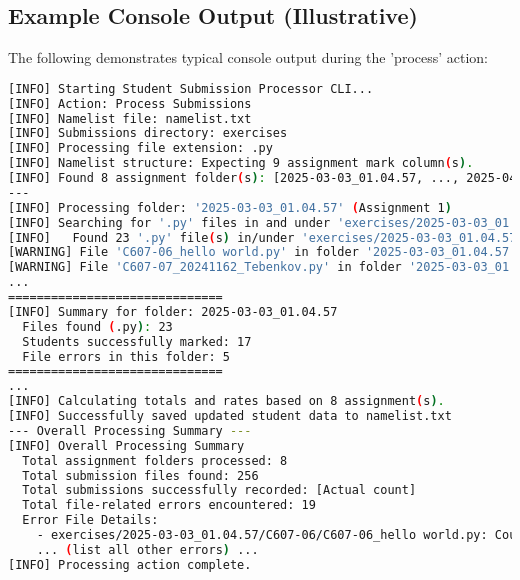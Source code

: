 \documentclass[11pt, a4paper]{article}
\begin{document}
\subsection*{Example Console Output (Illustrative)}
The following demonstrates typical console output during the 'process' action:
\begin{lstlisting}[language=bash, caption=Illustrative Console Output, basicstyle=\ttfamily\tiny]
[INFO] Starting Student Submission Processor CLI...
[INFO] Action: Process Submissions
[INFO] Namelist file: namelist.txt
[INFO] Submissions directory: exercises
[INFO] Processing file extension: .py
[INFO] Namelist structure: Expecting 9 assignment mark column(s).
[INFO] Found 8 assignment folder(s): [2025-03-03_01.04.57, ..., 2025-04-21_01.40.00]
---
[INFO] Processing folder: '2025-03-03_01.04.57' (Assignment 1)
[INFO] Searching for '.py' files in and under 'exercises/2025-03-03_01.04.57'...
[INFO]   Found 23 '.py' file(s) in/under 'exercises/2025-03-03_01.04.57'.
[WARNING] File 'C607-06_hello world.py' in folder '2025-03-03_01.04.57': Could not extract student ID.
[WARNING] File 'C607-07_20241162_Tebenkov.py' in folder '2025-03-03_01.04.57': Student ID '20241162' not found in namelist.
...
==============================
[INFO] Summary for folder: 2025-03-03_01.04.57
  Files found (.py): 23
  Students successfully marked: 17
  File errors in this folder: 5
==============================
...
[INFO] Calculating totals and rates based on 8 assignment(s).
[INFO] Successfully saved updated student data to namelist.txt
--- Overall Processing Summary ---
[INFO] Overall Processing Summary
  Total assignment folders processed: 8
  Total submission files found: 256
  Total submissions successfully recorded: [Actual count]
  Total file-related errors encountered: 19
  Error File Details:
    - exercises/2025-03-03_01.04.57/C607-06/C607-06_hello world.py: Could not extract student ID.
    ... (list all other errors) ...
[INFO] Processing action complete.
\end{lstlisting}
\end{document}
